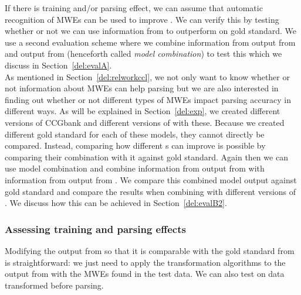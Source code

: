 \documentclass[output=paper]{langsci/langscibook}
\begin{document}
    \indent If there is training and/or parsing effect, we can assume that automatic recognition of MWEs can be used to improve . We can verify this by testing whether or not we can use information from {\modelB} to outperform {\modelA} on gold standard. We use a second evaluation scheme where we combine information from output from {\modelA} and output from {\modelB} (henceforth called \textit{model combination}) to test this which we discuss in Section~\ref{del:evalA}. \\
    \indent As mentioned in Section~\ref{del:relworkccl}, we not only want to know whether or not information about MWEs can help  parsing but we are also interested in finding out whether or not different types of MWEs impact parsing accuracy in different ways. As will be explained in Section~\ref{del:exp}, we created different versions of CCGbank and different versions of {\modelB} with these. Because we created different gold standard for each of these models, they cannot directly be compared. Instead, comparing how different {\modelB} s can improve {\modelA} is possible by comparing their combination with it against gold standard. Again then we can use model combination and combine information from output from {\modelA} with information from output from {\modelB}. We compare this combined model output against gold standard and compare the results when combining {\modelA} with different versions of {\modelB}. We discuss how this can be achieved in Section~\ref{del:evalB2}. 
    \subsubsection{Assessing training and parsing effects}
    \label{del:evalB}
    \indent Modifying the output from {\modelA} so that it is comparable with the gold standard from {\modelB} is straightforward: we just need to apply the transformation algorithms to the output from {\modelA} with the MWEs found in the test data. We can also test {\modelA} on data transformed before parsing.
\end{document}
